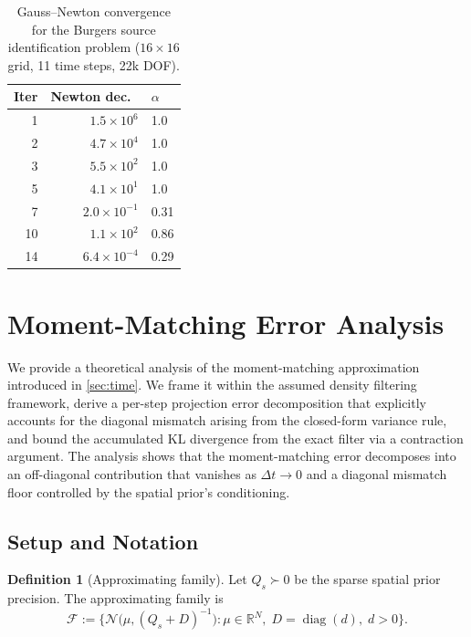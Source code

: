 \documentclass{article}
\theoremstyle{plain}
\theoremstyle{definition}
\newtheorem{definition}[theorem]{Definition}
\theoremstyle{remark}
\newcommand{\R}{\mathbb{R}}
\DeclareMathOperator{\diag}{diag}
\newcommand{\F}{\mathcal{F}}
\begin{document}
\begin{table}[h]
\centering
\caption{Gauss--Newton convergence for the Burgers source identification problem ($16 \times 16$ grid, 11 time steps, 22k DOF).}
\label{tab:gn_convergence}
\small
\begin{tabular}{rrl}
\toprule
Iter & Newton dec.\ & $\alpha$ \\
\midrule
1 & $1.5 \times 10^{6}$ & 1.0 \\
2 & $4.7 \times 10^{4}$ & 1.0 \\
3 & $5.5 \times 10^{2}$ & 1.0 \\
5 & $4.1 \times 10^{1}$ & 1.0 \\
7 & $2.0 \times 10^{-1}$ & 0.31 \\
10 & $1.1 \times 10^{2}$ & 0.86 \\
14 & $6.4 \times 10^{-4}$ & 0.29 \\
\bottomrule
\end{tabular}
\end{table}

\section{Moment-Matching Error Analysis}
\label{app:moment-matching-error}

We provide a theoretical analysis of the moment-matching approximation introduced in \cref{sec:time}.
We frame it within the assumed density filtering framework, derive a per-step projection error decomposition that explicitly accounts for the diagonal mismatch arising from the closed-form variance rule, and bound the accumulated KL divergence from the exact filter via a contraction argument.
The analysis shows that the moment-matching error decomposes into an off-diagonal contribution that vanishes as $\Delta t \to 0$ and a diagonal mismatch floor controlled by the spatial prior's conditioning.

\subsection{Setup and Notation}
\label{app:mm-setup}

\begin{definition}[Approximating family]
Let $Q_s \succ 0$ be the sparse spatial prior precision. The approximating family is
\begin{equation}\label{eq:family}
\F := \bigl\{ \mathcal{N}\bigl(\mu, (Q_s + D)^{-1}\bigr) : \mu \in \R^N,\; D = \diag(d),\; d > 0 \bigr\}.
\end{equation}
\end{definition}
\end{document}

